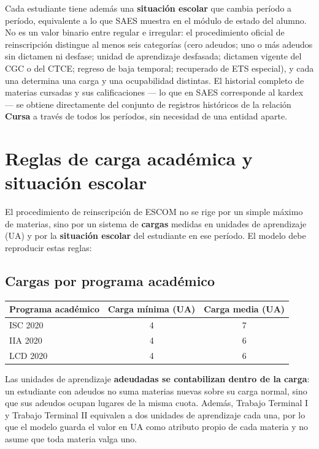 \documentclass[11pt,letterpaper]{article}
\begin{document}
Cada estudiante tiene además una \textbf{situación escolar} que cambia período a período, equivalente a lo que SAES muestra en el módulo de estado del alumno. No es un valor binario entre regular e irregular: el procedimiento oficial de reinscripción distingue al menos seis categorías (cero adeudos; uno o más adeudos sin dictamen ni desfase; unidad de aprendizaje desfasada; dictamen vigente del CGC o del CTCE; regreso de baja temporal; recuperado de ETS especial), y cada una determina una carga y una ocupabilidad distintas. El historial completo de materias cursadas y sus calificaciones --- lo que en SAES corresponde al kardex --- se obtiene directamente del conjunto de registros históricos de la relación \textbf{Cursa} a través de todos los períodos, sin necesidad de una entidad aparte.

\section{Reglas de carga académica y situación escolar}

El procedimiento de reinscripción de ESCOM no se rige por un simple máximo de materias, sino por un sistema de \textbf{cargas} medidas en unidades de aprendizaje (UA) y por la \textbf{situación escolar} del estudiante en ese período. El modelo debe reproducir estas reglas:

\subsection{Cargas por programa académico}

\begin{center}
\begin{tabular}{lcc}
\toprule
\textbf{Programa académico} & \textbf{Carga mínima (UA)} & \textbf{Carga media (UA)} \\
\midrule
ISC 2020 & 4 & 7 \\
IIA 2020 & 4 & 6 \\
LCD 2020 & 4 & 6 \\
\bottomrule
\end{tabular}
\end{center}

Las unidades de aprendizaje \textbf{adeudadas se contabilizan dentro de la carga}: un estudiante con adeudos no suma materias nuevas sobre su carga normal, sino que sus adeudos ocupan lugares de la misma cuota. Además, Trabajo Terminal I y Trabajo Terminal II equivalen a dos unidades de aprendizaje cada una, por lo que el modelo guarda el valor en UA como atributo propio de cada materia y no asume que toda materia valga uno.
\end{document}
